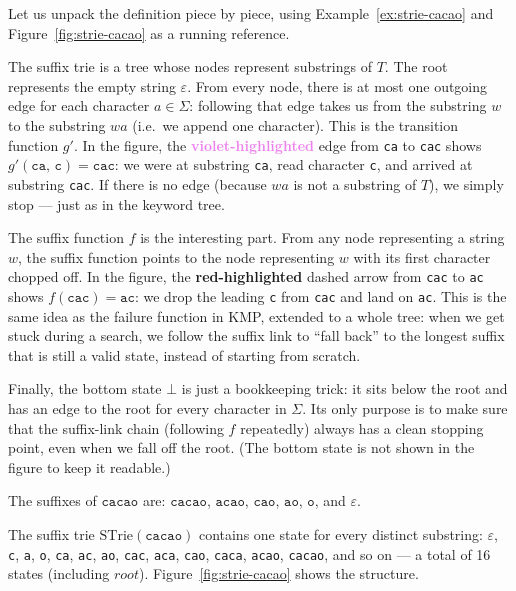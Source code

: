 Let us unpack the definition piece by piece, using
Example~\ref{ex:strie-cacao} and Figure~\ref{fig:strie-cacao} as a
running reference.

The suffix trie is a tree whose nodes represent substrings of $T$.
The root represents the empty string $\varepsilon$.
From every node, there is at most one outgoing edge for each character
$a \in \Sigma$: following that edge takes us from the substring $w$ to
the substring $wa$ (i.e.\ we append one character).
This is the transition function $g'$.
In the figure, the
\textcolor{violet}{\textbf{violet-highlighted}} edge from \texttt{ca}
to \texttt{cac} shows $g'(\texttt{ca},\, \texttt{c}) = \texttt{cac}$:
we were at substring \texttt{ca}, read character \texttt{c}, and arrived
at substring \texttt{cac}.
If there is no edge (because $wa$ is not a substring of $T$), we simply
stop --- just as in the keyword tree.

The suffix function $f$ is the interesting part.
From any node representing a string $w$, the suffix function points to
the node representing $w$ with its first character chopped off.
In the figure, the
\textcolor{red!70!black}{\textbf{red-highlighted}} dashed arrow from
\texttt{cac} to \texttt{ac} shows $f(\texttt{cac}) = \texttt{ac}$:
we drop the leading \texttt{c} from \texttt{cac} and land on
\texttt{ac}.
This is the same idea as the failure function in KMP, extended to a
whole tree: when we get stuck during a search, we follow the suffix
link to ``fall back'' to the longest suffix that is still a valid state,
instead of starting from scratch.

Finally, the bottom state $\bot$ is just a bookkeeping trick:
it sits below the root and has an edge to the root for every character in
$\Sigma$.
Its only purpose is to make sure that the suffix-link chain (following
$f$ repeatedly) always has a clean stopping point, even when we fall off
the root.
(The bottom state is not shown in the figure to keep it readable.)


\begin{example}[Suffix trie of $T = \texttt{cacao}$]
  \label{ex:strie-cacao}
  The suffixes of $\texttt{cacao}$ are:
  $\texttt{cacao}$, $\texttt{acao}$, $\texttt{cao}$, $\texttt{ao}$,
  $\texttt{o}$, and $\varepsilon$.

  The suffix trie $\mathrm{STrie}(\texttt{cacao})$ contains one state for every
  distinct substring: $\varepsilon$, \texttt{c}, \texttt{a}, \texttt{o},
  \texttt{ca}, \texttt{ac}, \texttt{ao}, \texttt{cac}, \texttt{aca},
  \texttt{cao}, \texttt{caca}, \texttt{acao}, \texttt{cacao},
  and so on --- a total of 16 states (including $root$).
  Figure~\ref{fig:strie-cacao} shows the structure.
\end{example}

